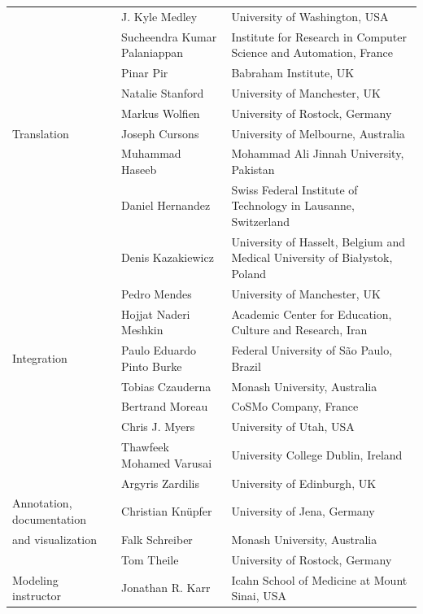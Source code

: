 \documentclass[journal,transmag]{IEEEtran}
\begin{document}
\begin{table}[ht!]
\begin{tabularx}{\textwidth}{llX}
                          & J. Kyle Medley                   & University of Washington, USA\\
                          & Sucheendra Kumar Palaniappan     & Institute for Research in Computer Science and Automation, France\\
                          & Pinar Pir                        & Babraham Institute, UK\\
                          & Natalie Stanford                 & University of Manchester, UK\\
                          & Markus Wolfien                   & University of Rostock, Germany\\
\midrule
Translation               & Joseph Cursons                   & University of Melbourne, Australia\\
                          & Muhammad Haseeb                  & Mohammad Ali Jinnah University, Pakistan\\
                          & Daniel Hernandez                 & Swiss Federal Institute of Technology in Lausanne, Switzerland\\
                          & Denis Kazakiewicz                & University of Hasselt, Belgium and Medical University of Bia\l{}ystok, Poland\\
                          & Pedro Mendes                     & University of Manchester, UK\\
                          & Hojjat Naderi Meshkin            & Academic Center for Education, Culture and Research, Iran\\
\midrule
Integration               & Paulo Eduardo Pinto Burke        & Federal University of S\~ao Paulo, Brazil\\
                          & Tobias Czauderna                 & Monash University, Australia\\
                          & Bertrand Moreau                  & CoSMo Company, France\\
                          & Chris J. Myers                   & University of Utah, USA\\
                          & Thawfeek Mohamed Varusai         & University College Dublin, Ireland\\
                          & Argyris Zardilis                 & University of Edinburgh, UK\\
\midrule
Annotation, documentation & Christian Kn\"upfer              & University of Jena, Germany\\
and visualization         & Falk Schreiber                   & Monash University, Australia\\
                          & Tom Theile                       & University of Rostock, Germany\\
\midrule
Modeling instructor       & Jonathan R. Karr                 & Icahn School of Medicine at Mount Sinai, USA\\
\bottomrule
\end{tabularx}
\end{table}
\end{document}
